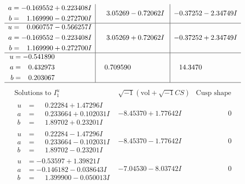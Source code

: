 \documentclass[1p]{elsarticle_modified}
\theoremstyle{definition}
\newcommand{\I}{\sqrt{-1}}
\begin{document}
$$\begin{array}{c|c|c}
\begin{aligned}
a &= -0.169552 + 0.223408 I \\
b &= \phantom{-}1.169990 - 0.272700 I\end{aligned}
 & \phantom{-}3.05269 - 0.72062 I & -0.37252 - 2.34749 I \\ \hline\begin{aligned}
u &= \phantom{-}0.060757 - 0.566257 I \\
a &= -0.169552 - 0.223408 I \\
b &= \phantom{-}1.169990 + 0.272700 I\end{aligned}
 & \phantom{-}3.05269 + 0.72062 I & -0.37252 + 2.34749 I \\ \hline\begin{aligned}
u &= -0.541890\phantom{ +0.000000I} \\
a &= \phantom{-}0.432973\phantom{ +0.000000I} \\
b &= \phantom{-}0.203067\phantom{ +0.000000I}\end{aligned}
 & \phantom{-}0.709590\phantom{ +0.000000I} & \phantom{-}14.3470\phantom{ +0.000000I}\\
 \hline 
 \end{array}$$\newpage$$\begin{array}{c|c|c}  
\text{Solutions to }I^u_{1}& \I (\text{vol} + \sqrt{-1}CS) & \text{Cusp shape}\\
 \hline 
\begin{aligned}
u &= \phantom{-}0.22284 + 1.47296 I \\
a &= \phantom{-}0.233664 + 0.102031 I \\
b &= \phantom{-}1.89702 + 0.23201 I\end{aligned}
 & -8.45370 + 1.77642 I & \phantom{-0.000000 } 0 \\ \hline\begin{aligned}
u &= \phantom{-}0.22284 - 1.47296 I \\
a &= \phantom{-}0.233664 - 0.102031 I \\
b &= \phantom{-}1.89702 - 0.23201 I\end{aligned}
 & -8.45370 - 1.77642 I & \phantom{-0.000000 } 0 \\ \hline\begin{aligned}
u &= -0.53597 + 1.39821 I \\
a &= -0.146182 - 0.038643 I \\
b &= \phantom{-}1.399900 - 0.050013 I\end{aligned}
 & -7.04530 - 8.03742 I & \phantom{-0.000000 } 0 \\ \hline\begin{aligned}

\end{aligned}
\end{array}$$
\end{document}
